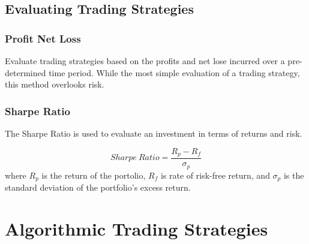 \documentclass{article}
\begin{document}
\subsection{Evaluating Trading Strategies}
\subsubsection*{Profit Net Loss}
Evaluate trading strategies based on the profits and net lose incurred over a pre-determined time period. While the most simple evaluation of a trading strategy, this method overlooks risk.

\subsubsection*{Sharpe Ratio}

The Sharpe Ratio is used to evaluate an investment in terms of returns and risk. 

$$
Sharpe \ Ratio = \frac{R_p - R_f}{\sigma_p}
$$
where $R_p$ is the return of the portolio, $R_f$ is rate of risk-free return, and $\sigma_p$ is the standard deviation of the portfolio's excess return.



\section{Algorithmic Trading Strategies}
\end{document}
